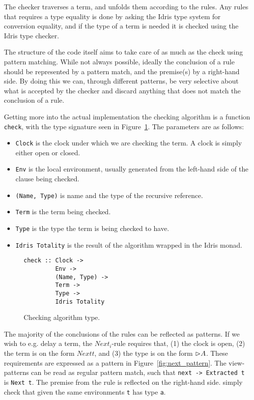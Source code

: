 The checker traverses a term, and unfolds them according to the rules. Any rules
that requires a type equality is done by asking the Idris type system for
conversion equality, and if the type of a term is needed it is checked using the
Idris type checker.

The structure of the code itself aims to take care of as much as the check using
pattern matching. While not always possible, ideally the conclusion of a rule
should be represented by a pattern match, and the premise(s) by a right-hand
side. By doing this we can, through different patterns, be very selective about
what is accepted by the checker and discard anything that does not match the
conclusion of a rule.

Getting more into the actual implementation the checking algorithm is a function
\texttt{check}, with the type signature seen in Figure~\ref{fig:check_type}. The
parameters are as follows:

\begin{itemize}
\item \texttt{Clock} is the clock under which we are checking the term. A clock
  is simply either open or closed.
\item \texttt{Env} is the local environment, usually generated from the
  left-hand side of the clause being checked.
\item \texttt{(Name, Type)} is name and the type of the recursive
  reference. 
\item \texttt{Term} is the term being checked.
\item \texttt{Type} is the type the term is being checked to have.
\item \texttt{Idris Totality} is the result of the algorithm wrapped in the
  Idris monad. 
\end{itemize}

\begin{figure}[h]
\begin{lstlisting}
check :: Clock -> 
         Env -> 
         (Name, Type) -> 
         Term -> 
         Type -> 
         Idris Totality
\end{lstlisting}  
  \caption{Checking algorithm type.}
  \label{fig:check_type}
\end{figure}

The majority of the conclusions of the rules can be reflected as patterns. If we
wish to e.g. delay a term, the $Next_i$-rule requires that, (1) the clock is
open, (2) the term is on the form $Next t$, and (3) the type is on the form
$\rhd A$. These requirements are expressed as a pattern in
Figure~\ref{fig:next_pattern}. The view-patterns can be read as regular pattern
match, such that \texttt{next -> Extracted t} is \texttt{Next t}. The premise
from the rule is reflected on the right-hand side. simply check that given the
same environments \texttt{t} has type \texttt{a}.

